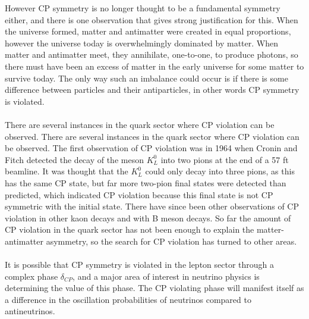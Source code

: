 \documentclass[12pt]{article}
\begin{document}
However CP symmetry is no longer thought to be a fundamental symmetry either, and there is one observation that gives strong justification for this. When the universe formed, matter and antimatter were created in equal proportions, however the universe today is overwhelmingly dominated by matter. When matter and antimatter meet, they annihilate, one-to-one, to produce photons, so there must have been an excess of matter in the early universe for some matter to survive today. The only way such an imbalance could occur is if there is some difference between particles and their antiparticles, in other words CP symmetry is violated.\\\\
There are several instances in the quark sector where CP violation can be observed. There are several instances in the quark sector where CP violation can be observed. The first observation of CP violation was in 1964 when Cronin and Fitch detected the decay of the meson $K_{L}^0$ into two pions at the end of a 57 ft beamline. It was thought that the $K_{L}^0$ could only decay into three pions, as this has the same CP state, but far more two-pion final states were detected than predicted, which indicated CP violation because this final state is not CP symmetric with the initial state\cite{Cronin}. There have since been other observations of CP violation in other kaon decays and with B meson decays.\cite{PDG} So far the amount of CP violation in the quark sector has not been enough to explain the matter-antimatter asymmetry, so the search for CP violation has turned to other areas.\\\\
It is possible that CP symmetry is violated in the lepton sector through a complex phase $\delta_{CP}$, and a major area of interest in neutrino physics is determining the value of this phase. The CP violating phase will manifest itself as a difference in the oscillation probabilities of neutrinos compared to antineutrinos.
\end{document}
